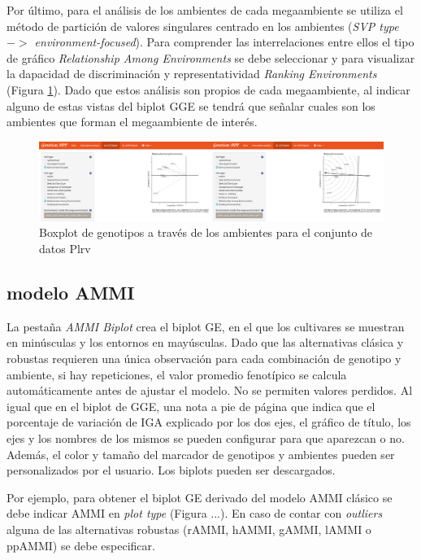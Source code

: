 Por último, para el análisis de los ambientes de cada megaambiente se utiliza el método de partición de valores singulares centrado en los ambientes (\emph{SVP type $->$ environment-focused}). Para comprender las interrelaciones entre ellos el tipo de gráfico \emph{Relationship Among Environments} se debe seleccionar y para visualizar la dapacidad de discriminación y representatividad 
\emph{Ranking Environments} (Figura \ref{fig:ggebip3}). Dado que estos análisis son propios de cada megaambiente, al indicar alguno de estas vistas del biplot GGE se tendrá que señalar cuales son los ambientes que forman el megaambiente de interés. 


\begin{figure}[H]
	\begin{center}
		\includegraphics[width=16cm]{./Graficos/www/GGE_biplotAPP3.png}
	\end{center}
	\caption{Boxplot de genotipos a través de los ambientes para el conjunto de datos Plrv}
	\label{fig:ggebip3}
\end{figure}


\subsection{modelo AMMI}

La pestaña \emph{AMMI Biplot} crea el biplot GE, en el que los cultivares se muestran en minúsculas y los entornos en mayúsculas. Dado que las alternativas clásica y robustas requieren una única observación para cada combinación de genotipo y ambiente, si hay repeticiones, el valor promedio fenotípico se calcula automáticamente antes de ajustar el modelo. No se permiten valores perdidos. Al igual que en el biplot de GGE, una nota a pie de página que indica que el porcentaje de variación de IGA explicado por los dos ejes, el gráfico de título, los ejes y los nombres de los mismos se pueden configurar para que aparezcan o no. Además, el color y tamaño del marcador de genotipos y ambientes pueden ser personalizados por el usuario. Los biplots pueden ser descargados.

Por ejemplo, para obtener el biplot GE derivado del modelo AMMI clásico se debe indicar
AMMI en \emph{plot type} (Figura ...). En caso de contar con \emph{outliers} alguna de las alternativas robustas (rAMMI, hAMMI, gAMMI, lAMMI o ppAMMI) se debe especificar.
 

